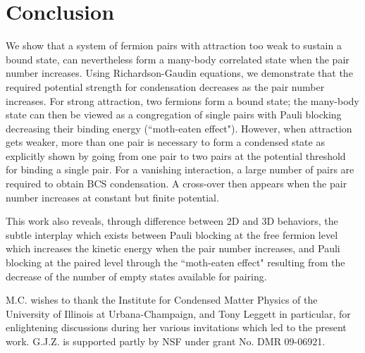 \documentclass[5p,twocolumn]{elsarticle}
\begin{document}
 

\section{Conclusion\label{sec:conclusion}}
We  show that a system of fermion pairs with attraction too weak to sustain a bound state, can nevertheless form a many-body correlated state when the pair number increases.  Using Richardson-Gaudin equations, we demonstrate that the required potential strength for condensation decreases as the pair number increases.  For strong attraction, two fermions form a bound state; the many-body state can then be viewed as a congregation of single pairs with Pauli blocking decreasing their binding energy (``moth-eaten effect").  However, when attraction gets weaker, more than one pair is necessary to form a condensed state as explicitly shown by going from one pair to two pairs at the potential threshold for binding a single pair.  For a vanishing interaction, a large number of pairs are required to obtain BCS condensation.   A cross-over then appears when the pair number increases at constant but finite potential.

 This work also reveals, through difference between 2D and 3D behaviors, the subtle interplay which exists between Pauli blocking at the free fermion level which increases the kinetic energy when the pair number increases, and Pauli blocking at the paired level through the ``moth-eaten effect" resulting from the decrease of the number of empty states available for pairing.

M.C. wishes to thank the Institute for Condensed Matter Physics of the University of Illinois at
Urbana-Champaign, and Tony Leggett in particular, for enlightening discussions during her various invitations which led to the present work. G.J.Z. is supported partly by NSF under grant No. DMR 09-06921.  
\end{document}

